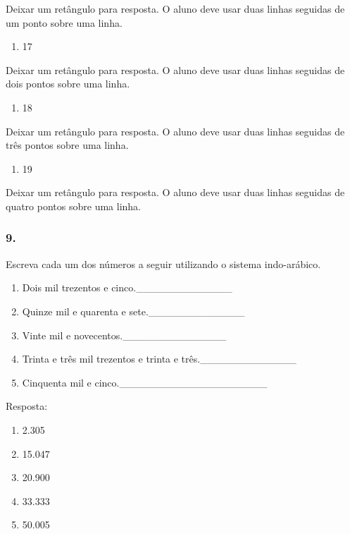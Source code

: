 \begin{enumerate}
Deixar um retângulo para resposta.
O aluno deve usar duas linhas seguidas de um ponto sobre uma linha.

\begin{enumerate}
\def\labelenumi{\alph{enumi})}
\item
  17
\end{enumerate}

Deixar um retângulo para resposta.
O aluno deve usar duas linhas seguidas de dois pontos sobre uma linha.

\begin{enumerate}
\def\labelenumi{\alph{enumi})}
\item
  18
\end{enumerate}

Deixar um retângulo para resposta.
O aluno deve usar duas linhas seguidas de três pontos sobre uma linha.

\begin{enumerate}
\def\labelenumi{\alph{enumi})}
\item
  19
\end{enumerate}

Deixar um retângulo para resposta.
O aluno deve usar duas linhas seguidas de quatro pontos sobre uma linha.


\subsubsection{9.}\label{section-8}

Escreva cada um dos números a seguir utilizando o sistema indo-arábico.

\begin{enumerate}
\def\labelenumi{\alph{enumi})}
\item
  Dois mil trezentos e cinco.\_\_\_\_\_\_\_\_\_\_\_\_\_
\item
  Quinze mil e quarenta e sete.\_\_\_\_\_\_\_\_\_\_\_\_\_
\item
  Vinte mil e novecentos.\_\_\_\_\_\_\_\_\_\_\_\_\_\_
\item
  Trinta e três mil trezentos e trinta e três.\_\_\_\_\_\_\_\_\_\_\_\_\_
\item
  Cinquenta mil e cinco.\_\_\_\_\_\_\_\_\_\_\_\_\_\_\_\_\_\_\_\_
\end{enumerate}

Resposta:

\begin{enumerate}
\def\labelenumi{\alph{enumi})}
\item
  2.305
\item
  15.047
\item
  20.900
\item
  33.333
\item
  50.005
\end{enumerate}


\end{enumerate}
